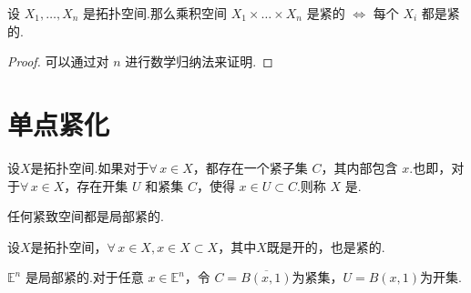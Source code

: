 \begin{corollary}[Tychonoff定理][cor:6.3]
    设 $X_1, \dots, X_n$ 是拓扑空间.那么乘积空间 $X_1 \times \dots \times X_n$ 是紧的 $\iff$ 每个 $X_i$ 都是紧的.
\end{corollary}
\begin{proof}
    可以通过对 $n$ 进行数学归纳法来证明.
\end{proof}

\section{单点紧化}

\begin{definition}[局部紧空间][def:6.5]
    设$X$是拓扑空间.如果对于$\forall\,x \in X$，都存在一个紧子集 $C$，其内部包含 $x$.也即，对于$\forall\, x \in X$，存在开集 $U$ 和紧集 $C$，使得 $x \in U \subset C$.则称 $X$ 是.
\end{definition}

\begin{instance}
    任何紧致空间都是局部紧的.\par
    设$X$是拓扑空间，$\forall\, x\in X,x\in X\subset X$，其中$X$既是开的，也是紧的.
\end{instance}

\begin{instance}
    $\mathbb{E}^n$ 是局部紧的.对于任意 $x \in \mathbb{E}^n$，令 $C = \overline{B(x, 1)}$为紧集，$U = B(x, 1)$为开集.
\end{instance}

